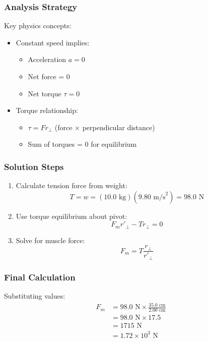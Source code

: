 \documentclass{beamer}
\begin{document}
\begin{frame}
\frametitle{Analysis Strategy}
Key physics concepts:
\begin{itemize}
    \item Constant speed implies:
    \begin{itemize}
        \item Acceleration $a = 0$
        \item Net force = 0
        \item Net torque $\tau = 0$
    \end{itemize}
    \item Torque relationship:
    \begin{itemize}
        \item $\tau = F r_\perp$ (force × perpendicular distance)
        \item Sum of torques = 0 for equilibrium
    \end{itemize}
\end{itemize}
\end{frame}

\begin{frame}
\frametitle{Solution Steps}
\begin{enumerate}
    \item Calculate tension force from weight:
    \[T = w = (10.0\text{ kg})(9.80\text{ m/s}^2) = 98.0\text{ N}\]
    \item Use torque equilibrium about pivot:
    \[F_m r'_\perp - T r_\perp = 0\]
    \item Solve for muscle force:
    \[F_m = T\frac{r_\perp}{r'_\perp}\]
\end{enumerate}
\end{frame}

\begin{frame}
\frametitle{Final Calculation}
Substituting values:
\begin{align*}
F_m &= 98.0\text{ N} \times \frac{35.0\text{ cm}}{2.00\text{ cm}}\\
&= 98.0\text{ N} \times 17.5\\
&= 1715\text{ N}\\
&= 1.72 \times 10^3\text{ N}
\end{align*}
\end{frame}
\end{document}
